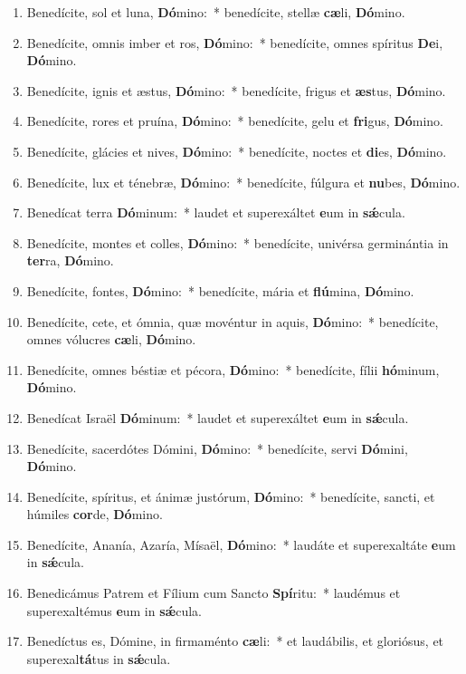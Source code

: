 \documentclass[twoside]{article}
\begin{document}
\begin{paracol}[1]{2}

\begin{enumerate}[wide, itemsep=0mm, labelwidth=!, labelindent=0pt, label=\color{gregoriocolor}\theenumi]
\item Benedícite, sol et luna, \textbf{Dó}mino:~* benedícite, stellæ \textbf{cæ}li, \textbf{Dó}mino.
\item Benedícite, omnis imber et ros, \textbf{Dó}mino:~* benedícite, omnes spíritus \textbf{De}i, \textbf{Dó}mino.
\item Benedícite, ignis et æstus, \textbf{Dó}mino:~* benedícite, frigus et \textbf{æs}tus, \textbf{Dó}mino.
\item Benedícite, rores et pruína, \textbf{Dó}mino:~* benedícite, gelu et \textbf{fri}gus, \textbf{Dó}mino.
\item Benedícite, glácies et nives, \textbf{Dó}mino:~* benedícite, noctes et \textbf{di}es, \textbf{Dó}mino.
\item Benedícite, lux et ténebræ, \textbf{Dó}mino:~* benedícite, fúlgura et \textbf{nu}bes, \textbf{Dó}mino.
\item Benedícat terra \textbf{Dó}minum:~* laudet et superexáltet \textbf{e}um in \textbf{sǽ}cula.
\item Benedícite, montes et colles, \textbf{Dó}mino:~* benedícite, univérsa germinántia in \textbf{ter}ra, \textbf{Dó}mino.
\item Benedícite, fontes, \textbf{Dó}mino:~* benedícite, mária et \textbf{flú}mina, \textbf{Dó}mino.
\item Benedícite, cete, et ómnia, quæ movéntur in aquis, \textbf{Dó}mino:~* benedícite, omnes vólucres \textbf{cæ}li, \textbf{Dó}mino.
\item Benedícite, omnes béstiæ et pécora, \textbf{Dó}mino:~* benedícite, fílii \textbf{hó}minum, \textbf{Dó}mino.
\item Benedícat Israël \textbf{Dó}minum:~* laudet et superexáltet \textbf{e}um in \textbf{sǽ}cula.
\item Benedícite, sacerdótes Dómini, \textbf{Dó}mino:~* benedícite, servi \textbf{Dó}mini, \textbf{Dó}mino.
\item Benedícite, spíritus, et ánimæ justórum, \textbf{Dó}mino:~* benedícite, sancti, et húmiles \textbf{cor}de, \textbf{Dó}mino.
\item Benedícite, Ananía, Azaría, Mísaël, \textbf{Dó}mino:~* laudáte et superexaltáte \textbf{e}um in \textbf{sǽ}cula.
\item Benedicámus Patrem et Fílium cum Sancto \textbf{Spí}ritu:~* laudémus et superexaltémus \textbf{e}um in \textbf{sǽ}cula.
\item Benedíctus es, Dómine, in firmaménto \textbf{cæ}li:~* et laudábilis, et gloriósus, et superexal\textbf{tá}tus in \textbf{sǽ}cula.
\end{enumerate}


\end{paracol}
\end{document}
